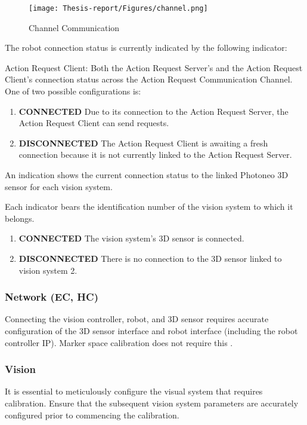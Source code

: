 \documentclass[12pt]{article}
\begin{document}
\begin{figure}[h]
    \centering
    \texttt{[image: Thesis-report/Figures/channel.png]}
    \caption{Channel Communication \cite{ref2}}
    \label{fig:Photoneo Camera}
\end{figure}

The robot connection status is currently indicated by the following indicator:

 Action Request Client: Both the Action Request Server's and the Action Request Client's connection status across the Action Request Communication Channel.  One of two possible configurations is: \cite{ref2}
 \begin{enumerate}
     \item  \textbf{CONNECTED} Due to its connection to the Action Request Server, the Action Request Client can send requests\cite{ref2}.
      \item   \textbf{DISCONNECTED} The Action Request Client is awaiting a fresh connection because it is not currently linked to the Action Request Server\cite{ref2}.

 \end{enumerate}

An indication shows the current connection status to the linked Photoneo 3D sensor for each vision system.

Each indicator bears the identification number of the vision system to which it belongs.
  \begin{enumerate}
  \item  \textbf{CONNECTED} The vision system's 3D sensor is connected\cite{ref2}.
  \item   \textbf{DISCONNECTED}  There is no connection to the 3D sensor linked to vision system 2\cite{ref2}.
 \end{enumerate}

\subsubsection{Network (EC, HC)}
Connecting the vision controller, robot, and 3D sensor requires accurate configuration of the 3D sensor interface and robot interface (including the robot controller IP).  Marker space calibration does not require this \cite {ref2}.
\subsubsection{Vision }
It is essential to meticulously configure the visual system that requires calibration.  Ensure that the subsequent vision system parameters are accurately configured prior to commencing the calibration.
\end{document}
